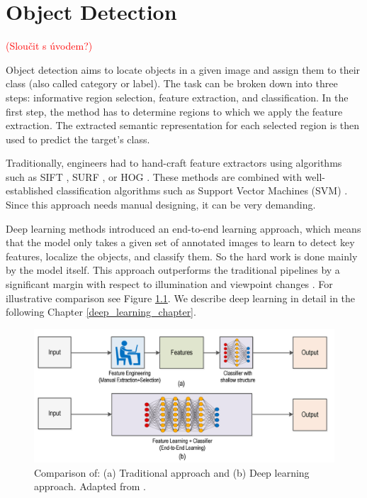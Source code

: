 \chapter{Object Detection}
\textcolor{red}{(Sloučit s úvodem?)}

Object detection aims to locate objects in a given image and assign them to their class (also called category or label). The task can be broken down into three steps: informative region selection, feature extraction, and classification. In the first step, the method has to determine regions to which we apply the feature extraction. The extracted semantic representation for each selected region is then used to predict the target's class. 

Traditionally, engineers had to hand-craft feature extractors using algorithms such as SIFT \cite{sift}, SURF \cite{surf}, or HOG \cite{hog}. These methods are combined with well-established classification algorithms such as Support Vector Machines (SVM) \cite{svm}. Since this approach needs manual designing, it can be very demanding.

Deep learning methods introduced an end-to-end learning approach, which means that the model only takes a given set of annotated images to learn to detect key features, localize the objects, and classify them. So the hard work is done mainly by the model itself. This approach outperforms the traditional pipelines by a significant margin with respect to illumination and viewpoint changes \cite{outperforming}. For illustrative comparison see Figure \ref{fig:comparison}. We describe deep learning in detail in the following Chapter \ref{deep_learning_chapter}.

\begin{figure}[h]
    \centering
    \includegraphics[width=\linewidth]{Sources/Figures/comparison.png}
    \caption{Comparison of: (a) Traditional approach and (b) Deep learning approach. Adapted from \cite{comparison_illustration}. }
    \label{fig:comparison}
\end{figure}

